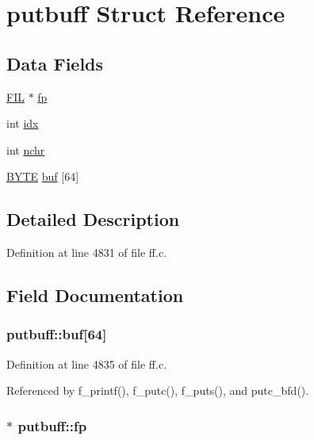 \hypertarget{structputbuff}{}\section{putbuff Struct Reference}
\label{structputbuff}
\subsection*{Data Fields}
\begin{DoxyCompactItemize}
\item 
\hyperlink{structFIL}{F\+IL} $\ast$ \hyperlink{structputbuff_a5c7baa85e569be17f4888f5d92f4453c}{fp}
\item 
int \hyperlink{structputbuff_a10a3ca93af8df07e9836ebd5230c06d8}{idx}
\item 
int \hyperlink{structputbuff_a125366bfe48077e6f562f95e30b4604a}{nchr}
\item 
\hyperlink{integer_8h_a4ae1dab0fb4b072a66584546209e7d58}{B\+Y\+TE} \hyperlink{structputbuff_ae623199e5d2851f95050670170f20329}{buf} \mbox{[}64\mbox{]}
\end{DoxyCompactItemize}


\subsection{Detailed Description}


Definition at line 4831 of file ff.\+c.



\subsection{Field Documentation}
\subsubsection[{\texorpdfstring{buf}{buf}}]{ putbuff\+::buf\mbox{[}64\mbox{]}}\hypertarget{structputbuff_ae623199e5d2851f95050670170f20329}{}\label{structputbuff_ae623199e5d2851f95050670170f20329}


Definition at line 4835 of file ff.\+c.



Referenced by f\+\_\+printf(), f\+\_\+putc(), f\+\_\+puts(), and putc\+\_\+bfd().

\subsubsection[{\texorpdfstring{fp}{fp}}]{$\ast$ putbuff\+::fp}\hypertarget{structputbuff_a5c7baa85e569be17f4888f5d92f4453c}{}\label{structputbuff_a5c7baa85e569be17f4888f5d92f4453c}


